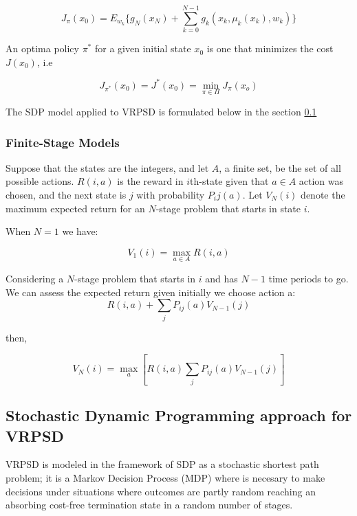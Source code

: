 \begin{equation}\label{eq:SDP_expected_cost_policy}
 J_\pi(x_0) = E_{w_k}\biggr\{g_N(x_N)+\sum_{k=0}^{N-1}g_k(x_k,\mu_k(x_k),w_k)\biggr\}
\end{equation}

An optima policy $\pi^*$ for a given initial state $x_0$ is one that minimizes the cost $J(x_0)$, i.e

\[J_{\pi^*}(x_0)=J^*(x_0)=\min\limits_{\pi\in\Pi}J_\pi(x_o)\]


The SDP model applied to VRPSD is formulated below in the section \ref{sec:SDP_model_VRPSD}


\subsubsection{Finite-Stage Models}%


Suppose that the states are the integers, and let $A$, a finite set, be the set of all possible actions.
$R(i,a)$ is the reward in $i$th-state given that $a \in A$ action was chosen, and the next state is $j$ with probability $P_ij(a)$.
Let $V_N(i)$ denote the maximum expected return for an $N$-stage problem that starts in state $i$.

When $N=1$ we have:

\begin{equation}\label{eq:maxValueN=1}
 V_1(i) =  \max_{a\in A}R(i,a)
\end{equation}

Considering a $N$-stage problem that starts in $i$ and has $N-1$ time periods to go. We can assess the expected return given initially we choose action a:
\[R(i,a)+\sum_jP_{ij}(a)V_{N-1}(j)\]

then,

\begin{equation}
 V_N(i)=\max_a[R(i,a)\sum_jP_{ij}(a)V_{N-1}(j)]
\end{equation}


\subsection{Stochastic Dynamic Programming approach for VRPSD}\label{sec:SDP_model_VRPSD}

VRPSD is modeled in the framework of SDP as a stochastic shortest path problem; it is a Markov Decision Process (MDP) where is necesary to make decisions under situations where outcomes are partly random reaching an absorbing cost-free termination state in a random number of stages.

